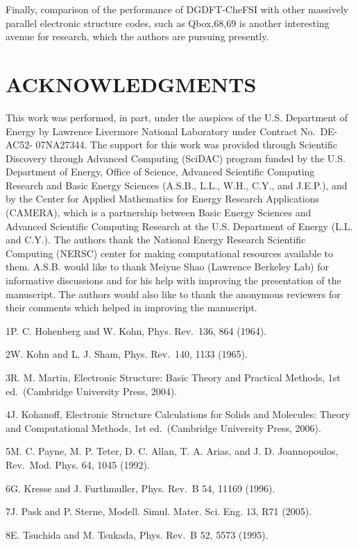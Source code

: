 \documentclass[
  10
]{article}
\begin{document}
Finally, comparison of the performance of DGDFT-CheFSI with other
massively parallel electronic structure codes, such as Qbox,68,69 is
another interesting avenue for research, which the authors are pursuing
presently.

\section{ACKNOWLEDGMENTS}\label{acknowledgments}

This work was performed, in part, under the auspices of the U.S.
Department of Energy by Lawrence Livermore National Laboratory under
Contract No.~DE-AC52- 07NA27344. The support for this work was provided
through Scientific Discovery through Advanced Computing (SciDAC) program
funded by the U.S. Department of Energy, Office of Science, Advanced
Scientific Computing Research and Basic Energy Sciences (A.S.B., L.L.,
W.H., C.Y., and J.E.P.), and by the Center for Applied Mathematics for
Energy Research Applications (CAMERA), which is a partnership between
Basic Energy Sciences and Advanced Scientific Computing Research at the
U.S. Department of Energy (L.L. and C.Y.). The authors thank the
National Energy Research Scientific Computing (NERSC) center for making
computational resources available to them. A.S.B. would like to thank
Meiyue Shao (Lawrence Berkeley Lab) for informative discussions and for
his help with improving the presentation of the manuscript. The authors
would also like to thank the anonymous reviewers for their comments
which helped in improving the manuscript.

1P. C. Hohenberg and W. Kohn, Phys. Rev.~136, 864 (1964).

2W. Kohn and L. J. Sham, Phys. Rev.~140, 1133 (1965).

3R. M. Martin, Electronic Structure: Basic Theory and Practical Methods,
1st ed.~(Cambridge University Press, 2004).

4J. Kohanoff, Electronic Structure Calculations for Solids and
Molecules: Theory and Computational Methods, 1st ed.~(Cambridge
University Press, 2006).

5M. C. Payne, M. P. Teter, D. C. Allan, T. A. Arias, and J. D.
Joannopoulos, Rev.~Mod. Phys. 64, 1045 (1992).

6G. Kresse and J. Furthmuller, Phys. Rev.~B 54, 11169 (1996).

7J. Pask and P. Sterne, Modell. Simul. Mater. Sci. Eng. 13, R71 (2005).

8E. Tsuchida and M. Tsukada, Phys. Rev.~B 52, 5573 (1995).
\end{document}

